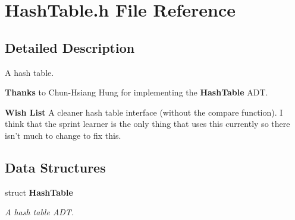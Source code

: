 \section{Hash\-Table.h File Reference}
\label{HashTable_8h}


\subsection{Detailed Description}
A hash table. 

\begin{Desc}
\item[{\bf Thanks}]to Chun-Hsiang Hung for implementing the {\bf Hash\-Table} ADT. \end{Desc}


\begin{Desc}
\item[{\bf Wish List}]A cleaner hash table interface (without the compare function). I think that the sprint learner is the only thing that uses this currently so there isn't much to change to fix this. \end{Desc}


\subsection*{Data Structures}
\begin{CompactItemize}
\item 
struct {\bf Hash\-Table}
\begin{CompactList}\small\item\em A hash table ADT. \item\end{CompactList}\end{CompactItemize}
